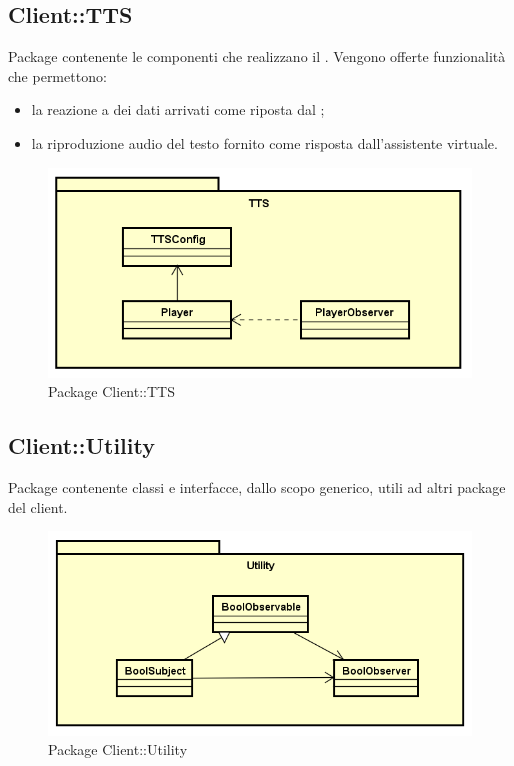 \subsection{Client::TTS}
Package contenente le componenti che realizzano il . Vengono offerte funzionalità che permettono: \begin{itemize} \item la reazione a dei dati arrivati come riposta dal ; \item la riproduzione audio del testo fornito come risposta dall'assistente virtuale. \end{itemize}
\begin{figure}[h] \centering \includegraphics[width=\textwidth,height=\textheight,keepaspectratio]{images/diagrams/client/Client/TTS.png}
\caption{Package Client::TTS}
\end{figure}
\newpage


\subsection{Client::Utility}
Package contenente classi e interfacce, dallo scopo generico, utili ad altri package del client.
\begin{figure}[h] \centering \includegraphics[width=\textwidth,height=\textheight,keepaspectratio]{images/diagrams/client/Client/Utility.png}
\caption{Package Client::Utility}
\end{figure}
\newpage

